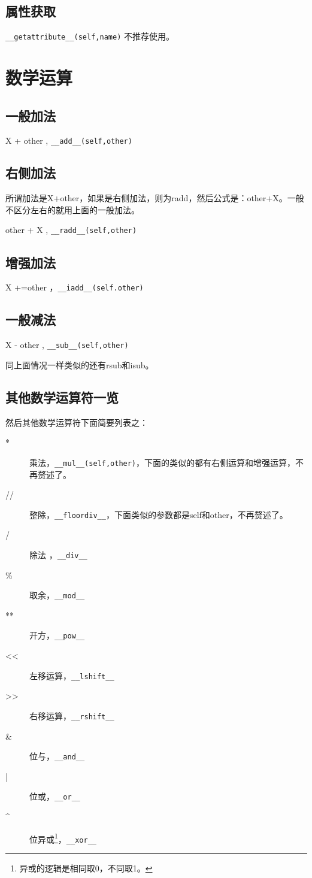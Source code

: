 \documentclass[12pt,oneside]{book}
\begin{document}
\begin{common-format}
\subsection{属性获取}
\verb+__getattribute__(self,name)+ 不推荐使用。

\section{数学运算}
\subsection{一般加法}
X + other , \verb+__add__(self,other)+

\subsection{右侧加法}
所谓加法是X+other，如果是右侧加法，则为radd，然后公式是：other+X。一般不区分左右的就用上面的一般加法。

other + X , \verb+__radd__(self,other)+
\subsection{增强加法}
X +=other ，\verb+__iadd__(self.other)+

\subsection{一般减法}
X - other , \verb+__sub__(self,other)+

同上面情况一样类似的还有rsub和isub。

\subsection{其他数学运算符一览}
然后其他数学运算符下面简要列表之：
\begin{description}
\item[*] 乘法，\verb+__mul__(self,other)+，下面的类似的都有右侧运算和增强运算，不再赘述了。
\item[//] 整除，\verb+__floordiv__+，下面类似的参数都是self和other，不再赘述了。
\item[/] 除法 ，\verb+__div__+
\item[\%{}] 取余，\verb+__mod__+
\item[**] 开方，\verb+__pow__+
\item[<<] 左移运算，\verb+__lshift__+
\item[>>] 右移运算，\verb+__rshift__+
\item[\&{}] 位与，\verb+__and__+
\item[|] 位或，\verb+__or__+
\item[\^{}] 位异或\footnote{异或的逻辑是相同取0，不同取1。}，\verb+__xor__+
\end{description}


\end{common-format}
\end{document}
